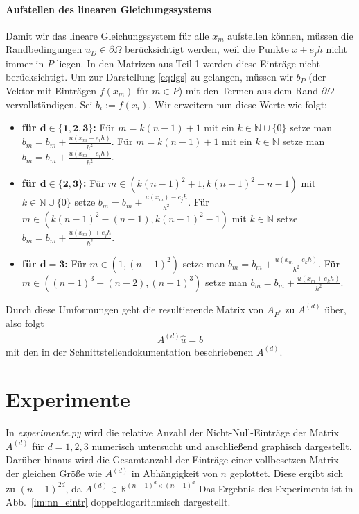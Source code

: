 \documentclass[smallheadings]{scrartcl}
\begin{document}
\paragraph{Aufstellen des linearen Gleichungssystems}

Damit wir das lineare Gleichungssystem für alle $x_m$ aufstellen können, müssen die Randbedingungen $u_D \in \partial\Omega$ berücksichtigt werden, weil die Punkte $x \pm e_jh$ nicht immer in $P$ liegen. In den Matrizen aus Teil 1 werden diese Einträge nicht berücksichtigt. Um zur Darstellung \eqref{eq:lgs} zu gelangen, müssen wir $b_P$ (der Vektor mit Einträgen $f(x_m)$ für $m \in P$) mit den Termen aus dem Rand $\partial\Omega$ vervollständigen. 
Sei $b_i :=f(x_i)$. Wir erweitern nun diese Werte wie folgt:

\begin{itemize}

\item \textbf{für $\boldsymbol{d\in \{1, 2, 3\} }$:}
Für $m = k(n-1)+1$ mit ein $k \in \mathbb{N}\cup \{0\}$ setze man $b_m = b_m + \frac{u(x_m - e_ih)}{h^2}$. Für $m = k(n-1) +1$ mit ein $k \in \mathbb{N}$ setze man $b_m = b_m + \frac{u(x_m + e_ih)}{h^2}$. 
\item \textbf{für $\boldsymbol{d\in \{2, 3\} }$:}
Für $m \in (k(n-1)^2+1, k(n-1)^2+n-1)$ mit  $k \in \mathbb{N}\cup \{0\}$ setze  $b_m = b_m + \frac{u(x_m)-e_jh}{h^2}$. Für $m \in (k(n-1)^2-(n-1), k(n-1)^2-1)$ mit $k \in \mathbb{N}$ setze  $b_m = b_m + \frac{u(x_m)+e_jh}{h^2}$.
\item \textbf{für $\boldsymbol{d=3 }$:}
Für $m\in (1, (n-1)^2)$ setze man $b_m = b_m + \frac{u(x_m-e_kh)}{h^2}$. Für $m\in ((n-1)^3-(n-2), (n-1)^3)$ setze man $b_m = b_m + \frac{u(x_m+e_kh)}{h^2}$.  
\end{itemize}
Durch diese Umformungen geht die resultierende Matrix von $A_{P^*}$ zu $A^{(d)}$ über, also folgt
\begin{align}
A^{(d)}\hat{u}=b
\end{align}
mit den in der Schnittstellendokumentation beschriebenen $A^{(d)}$.

\section{Experimente}

In \textit{experimente.py} wird die relative Anzahl der Nicht-Null-Einträge der Matrix $A^{(d)}$ für $d=1,2,3$ numerisch untersucht und anschließend graphisch dargestellt. Darüber hinaus wird die Gesamtanzahl der Einträge einer vollbesetzen Matrix der gleichen Größe wie $A^{(d)}$ in Abhängigkeit von $n$ geplottet. Diese ergibt sich zu $(n-1)^{2d}$, da $A^{(d)}\in\mathbb{R}^{(n-1)^d\times(n-1)^d}$ Das Ergebnis des Experiments ist in Abb.~\ref{im:nn_eintr} doppeltlogarithmisch dargestellt.
\end{document}
